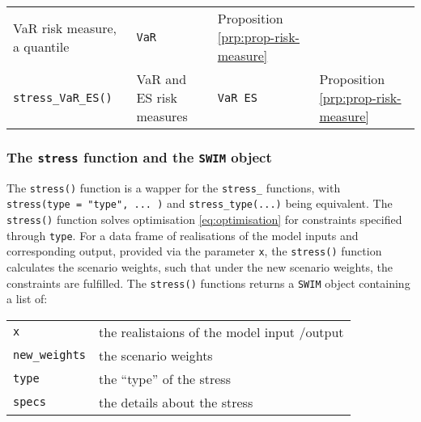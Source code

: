 \documentclass[]{article}
\theoremstyle{definition}
\theoremstyle{definition}
\theoremstyle{definition}
\theoremstyle{remark}
\begin{document}
\begin{longtable}[]{@{}llll@{}}
\begin{minipage}[t]{0.38\columnwidth}
VaR risk measure, a quantile\strut
\end{minipage} & \begin{minipage}[t]{0.09\columnwidth}\raggedright
\texttt{VaR}\strut
\end{minipage} & \begin{minipage}[t]{0.19\columnwidth}\raggedright
Proposition \ref{prp:prop-risk-measure}\strut
\end{minipage}\tabularnewline
\begin{minipage}[t]{0.22\columnwidth}\raggedright
\texttt{stress\_VaR\_ES()}\strut
\end{minipage} & \begin{minipage}[t]{0.38\columnwidth}\raggedright
VaR and ES risk measures\strut
\end{minipage} & \begin{minipage}[t]{0.09\columnwidth}\raggedright
\texttt{VaR\ ES}\strut
\end{minipage} & \begin{minipage}[t]{0.19\columnwidth}\raggedright
Proposition \ref{prp:prop-risk-measure}\strut
\end{minipage}\tabularnewline
\bottomrule
\end{longtable}

\hypertarget{the-stress-function-and-the-swim-object}{%
\subsubsection{\texorpdfstring{The \texttt{stress} function and the \texttt{SWIM} object}{The stress function and the SWIM object}}\label{the-stress-function-and-the-swim-object}}

The \texttt{stress()} function is a wapper for the \texttt{stress\_} functions, with \texttt{stress(type\ =\ "type",\ ...\ )} and \texttt{stress\_type(...)} being equivalent. The \texttt{stress()} function solves optimisation \eqref{eq:optimisation} for constraints specified through \texttt{type}. For a data frame of realisations of the model inputs and corresponding output, provided via the parameter \texttt{x}, the \texttt{stress()} function calculates the scenario weights, such that under the new scenario weights, the constraints are fulfilled. The \texttt{stress()} functions returns a \texttt{SWIM} object containing a list of:

\begin{longtable}[]{@{}ll@{}}
\toprule
\endhead
\texttt{x} & the realistaions of the model input /output\tabularnewline
\texttt{new\_weights} & the scenario weights\tabularnewline
\texttt{type} & the ``type'' of the stress\tabularnewline
\texttt{specs} & the details about the stress\tabularnewline
\bottomrule
\end{longtable}
\end{document}
